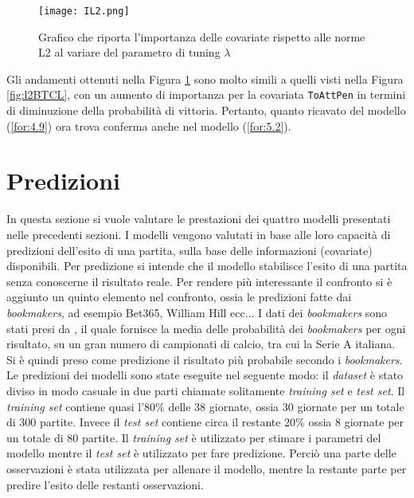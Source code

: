 \begin{figure}[!htbp]
	\begin{center}
		\texttt{[image: IL2.png]}
		\caption{Grafico che riporta l'importanza delle covariate rispetto alle norme L2 al variare del parametro di tuning $\lambda$} \label{fig:IL2}
	\end{center}
\end{figure}

Gli andamenti ottenuti nella Figura \ref{fig:IL2} sono molto simili a quelli visti nella Figura \ref{fig:l2BTCL}, con un aumento di importanza per la covariata \texttt{ToAttPen} in termini di diminuzione della probabilità di vittoria. Pertanto, quanto ricavato del modello (\ref{for:4.9}) ora trova conferma anche nel modello (\ref{for:5.2}).
\pagebreak

\section{Predizioni}
In questa sezione si vuole valutare le prestazioni dei quattro modelli presentati nelle precedenti sezioni. I modelli vengono valutati in base alle loro capacità di predizioni dell'esito di una partita, sulla base delle informazioni (covariate) disponibili. Per predizione si intende che il modello stabilisce l'esito di una partita senza conoscerne il risultato reale. Per rendere più interessante il confronto si è aggiunto un quinto elemento nel confronto, ossia le predizioni fatte dai \emph{bookmakers}, ad esempio Bet365, William Hill ecc... I dati dei \emph{bookmakers} sono stati presi da \textit{\cite{bet}}, il quale fornisce la media delle probabilità dei \emph{bookmakers} per ogni risultato, su un gran numero di campionati di calcio, tra cui la Serie A italiana. Si è quindi preso come predizione il risultato più probabile secondo i \emph{bookmakers}.\\
Le predizioni dei modelli sono state eseguite nel seguente modo: il \emph{dataset} è stato diviso in modo casuale in due parti chiamate solitamente \emph{training set} e \emph{test set}. Il \emph{training set} contiene quasi l'80\% delle 38 giornate, ossia 30 giornate per un totale di 300 partite. Invece il \emph{test set} contiene circa il restante 20\% ossia 8 giornate per un totale di 80 partite. Il \emph{training set} è utilizzato per stimare i parametri del modello mentre il \emph{test set} è utilizzato per fare predizione. Perciò una parte delle osservazioni è stata utilizzata per allenare il modello, mentre la restante parte per predire l'esito delle restanti osservazioni. \\
